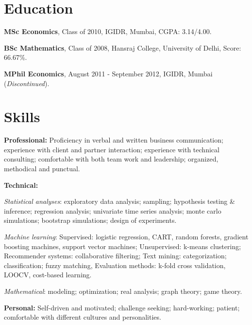 \documentclass[a4paper,11pt]{article}
\renewenvironment{itemize}{
\begin{list}{}{
  \setlength{\leftmargin}{1.5em}
  }
  }{
\end{list}
}
\begin{document}
\section*{Education}
\begin{itemize}
  \item \textbf{MSc Economics}, Class of 2010, IGIDR, Mumbai, CGPA: 3.14/4.00.
  \item \textbf{BSc Mathematics}, Class of 2008, Hansraj College, University of
    Delhi, Score: 66.67\%.
  \item \textbf{MPhil Economics}, August 2011 - September 2012, IGIDR, Mumbai
    (\emph{Discontinued}).
\end{itemize}

\section*{Skills}
\begin{itemize}
  \item \textbf{Professional:}
    Proficiency in verbal and written business communication; experience with
    client and partner interaction; experience with technical consulting;
    comfortable with both team work and leadership; organized, methodical and
    punctual.
  \item \textbf{Technical:}
    \begin{itemize}
      \item \emph{Statistical analyses}: exploratory data analysis; sampling;
        hypothesis testing \& inference; regression analysis; univariate time
        series analysis; monte carlo simulations; bootstrap simulations; design
        of experiments.
      \item \emph{Machine learning}: Supervised: logistic regression, CART,
        random forests, gradient boosting machines, support vector machines;
        Unsupervised: k-means clustering; Recommender systems: collaborative
        filtering; Text mining: categorization; classification; fuzzy matching,
        Evaluation methods: k-fold cross validation, LOOCV, cost-based
        learning.
      \item \emph{Mathematical}: modeling; optimization; real analysis; graph
        theory; game theory.
    \end{itemize}
  \item \textbf{Personal:}
    Self-driven and motivated; challenge seeking; hard-working; patient;
    comfortable with different cultures and personalities.
\end{itemize}
\end{document}
